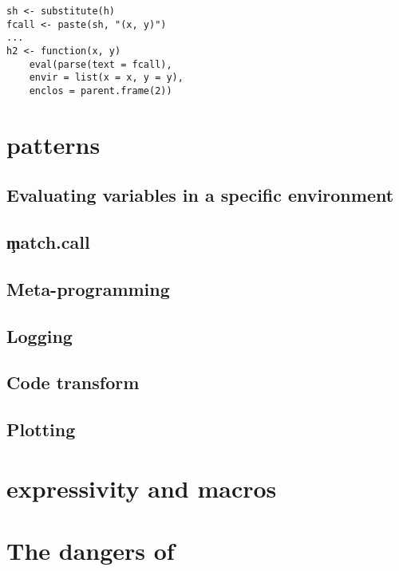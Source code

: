 \documentclass[acmsmall]{acmart}
\begin{document}
\begin{lstlisting}
sh <- substitute(h)
fcall <- paste(sh, "(x, y)")
...
h2 <- function(x, y)
    eval(parse(text = fcall),
    envir = list(x = x, y = y),
    enclos = parent.frame(2))
\end{lstlisting}


\section{\eval patterns}


\subsection{Evaluating variables in a specific environment}

\subsection{\c{match.call}}

\subsection{Meta-programming}

\subsection{Logging}

\subsection{Code transform}

\subsection{Plotting}

\section{\eval expressivity and macros}


\section{The dangers of \eval}
\end{document}
